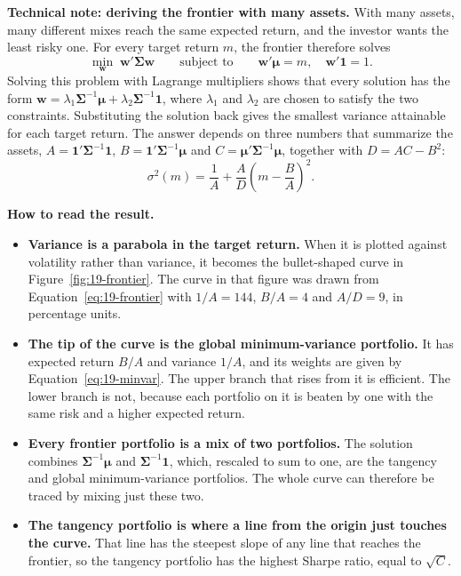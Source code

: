 \begin{callout}
\textbf{Technical note: deriving the frontier with many assets.} With many assets, many different mixes reach the same expected return, and the investor wants the least risky one. For every target return $m$, the frontier therefore solves
\begin{equation}
  \min_{\mathbf{w}} \; \mathbf{w}'\boldsymbol{\Sigma}\mathbf{w}
  \qquad \text{subject to} \qquad \mathbf{w}'\boldsymbol{\mu} = m, \quad \mathbf{w}'\mathbf{1} = 1.
  \label{eq:19-frontier-problem}
\end{equation}
Solving this problem with Lagrange multipliers shows that every solution has the form $\mathbf{w} = \lambda_1 \boldsymbol{\Sigma}^{-1}\boldsymbol{\mu} + \lambda_2 \boldsymbol{\Sigma}^{-1}\mathbf{1}$, where $\lambda_1$ and $\lambda_2$ are chosen to satisfy the two constraints. Substituting the solution back gives the smallest variance attainable for each target return. The answer depends on three numbers that summarize the assets, $A = \mathbf{1}'\boldsymbol{\Sigma}^{-1}\mathbf{1}$, $B = \mathbf{1}'\boldsymbol{\Sigma}^{-1}\boldsymbol{\mu}$ and $C = \boldsymbol{\mu}'\boldsymbol{\Sigma}^{-1}\boldsymbol{\mu}$, together with $D = AC - B^2$:
\begin{equation}
  \sigma^2(m) = \frac{1}{A} + \frac{A}{D}\left(m - \frac{B}{A}\right)^2.
  \label{eq:19-frontier}
\end{equation}

\textbf{How to read the result.}
\begin{itemize}
  \item \textbf{Variance is a parabola in the target return.} When it is plotted against volatility rather than variance, it becomes the bullet-shaped curve in Figure~\ref{fig:19-frontier}. The curve in that figure was drawn from Equation~\eqref{eq:19-frontier} with $1/A = 144$, $B/A = 4$ and $A/D = 9$, in percentage units.
  \item \textbf{The tip of the curve is the global minimum-variance portfolio.} It has expected return $B/A$ and variance $1/A$, and its weights are given by Equation~\eqref{eq:19-minvar}. The upper branch that rises from it is efficient. The lower branch is not, because each portfolio on it is beaten by one with the same risk and a higher expected return.
  \item \textbf{Every frontier portfolio is a mix of two portfolios.} The solution combines $\boldsymbol{\Sigma}^{-1}\boldsymbol{\mu}$ and $\boldsymbol{\Sigma}^{-1}\mathbf{1}$, which, rescaled to sum to one, are the tangency and global minimum-variance portfolios. The whole curve can therefore be traced by mixing just these two.
  \item \textbf{The tangency portfolio is where a line from the origin just touches the curve.} That line has the steepest slope of any line that reaches the frontier, so the tangency portfolio has the highest Sharpe ratio, equal to $\sqrt{C}$.
\end{itemize}
\end{callout}

